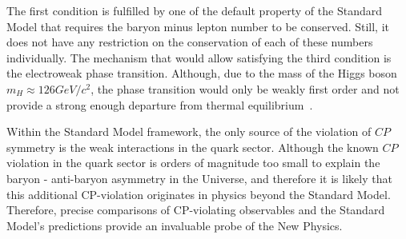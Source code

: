 The first condition is fulfilled by one of the default property of the Standard Model that requires the baryon minus lepton number to be conserved. Still, it does not have any restriction on the conservation of each of these numbers individually. The mechanism that would allow satisfying the third condition is the electroweak phase transition. Although, due to the mass of the Higgs boson $m_H \approx 126 GeV/c^{2}$, the phase transition would only be weakly first order and not provide a strong enough departure from thermal equilibrium~\cite{phase_transiton}. 

 Within the Standard Model framework, the only source of the violation of $CP$ symmetry is the weak interactions in the quark sector. Although the known $CP$ violation in the quark sector is orders of magnitude too small to explain the baryon - anti-baryon asymmetry in the Universe, and therefore it is likely that this additional CP-violation originates in physics beyond the Standard Model. Therefore, precise comparisons of CP-violating observables and the Standard Model's predictions provide an invaluable probe of the New Physics.